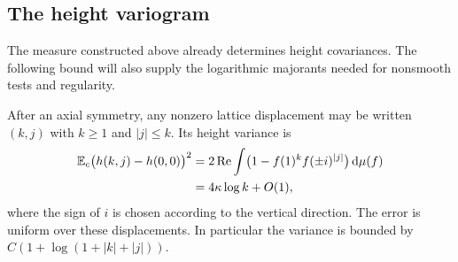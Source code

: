 \subsection{The height variogram}

The measure constructed above already determines height covariances.
The following bound will also supply the logarithmic majorants needed
for nonsmooth tests and regularity.

\begin{proposition}
\label{prop:variogram}
After an axial symmetry, any nonzero lattice displacement may be
written $(k,j)$ with $k\ge1$ and $|j|\le k$.  Its height variance is
\begin{equation}\label{eq:angular-variogram}
 \begin{aligned}
 \mathbb E_c\bigl(h(k,j)-h(0,0)\bigr)^2
 &=2\operatorname{Re}\int\bigl(1-f(1)^k f(\pm i)^{|j|}\bigr)\,\mathrm d\mu(f)\\
 &=4\kappa\log k+O(1),
 \end{aligned}
\end{equation}
where the sign of $i$ is chosen according to the vertical direction.
The error is uniform over these displacements.  In particular the
variance is bounded by $C(1+\log(1+|k|+|j|))$.
\end{proposition}

